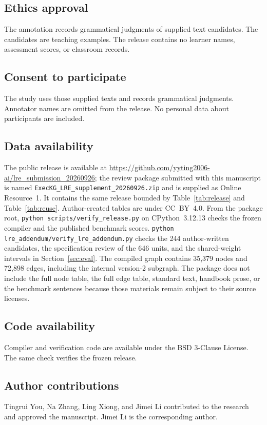 \documentclass[pdflatex,sn-mathphys,NameDate]{sn-jnl}
\begin{document}
\subsection*{Ethics approval}
The annotation records grammatical judgments of supplied text candidates.
The candidates are teaching examples.
The release contains no learner names, assessment scores, or classroom records.

\subsection*{Consent to participate}
The study uses those supplied texts and records grammatical judgments.
Annotator names are omitted from the release.
No personal data about participants are included.

\subsection*{Data availability}
The public release is available at \url{https://github.com/yyting2006-ai/lre_submission_20260926}; the review package submitted with this manuscript is named \texttt{ExecKG\_LRE\_supplement\_20260926.zip} and is supplied as Online Resource~1. It contains the same release bounded by Table~\ref{tab:release} and Table~\ref{tab:reuse}.
Author-created tables are under CC~BY~4.0.
From the package root, \texttt{python scripts/verify\_release.py} on CPython~3.12.13 checks the frozen compiler and the published benchmark scores.
\texttt{python lre\_addendum/verify\_lre\_addendum.py} checks the 244 author-written candidates, the specification review of the 646 units, and the shared-weight intervals in Section~\ref{sec:eval}.
The compiled graph contains 35,379 nodes and 72,898 edges, including the internal version-2 subgraph.
The package does not include the full node table, the full edge table, standard text, handbook prose, or the benchmark sentences because those materials remain subject to their source licenses.

\subsection*{Code availability}
Compiler and verification code are available under the BSD 3-Clause License.
The same check verifies the frozen release.

\subsection*{Author contributions}
Tingrui You, Na Zhang, Ling Xiong, and Jimei Li contributed to the research and approved the manuscript.
Jimei Li is the corresponding author.
\end{document}
